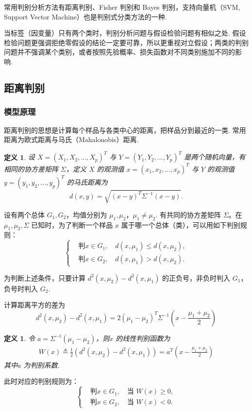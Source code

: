 \documentclass[12pt, a4paper, oneside]{ctexart}
\newtheorem{definition}[theorem]{定义}
\begin{document}
	常用判别分析方法有距离判别、Fisher 判别和 Bayes 判别，支持向量机（SVM, Support Vector Machine）也是判别式分类方法的一种.
	
	当标签（因变量）只有两个类时，判别分析问题与假设检验问题有相似之处. 假设检验问题更强调拒绝零假设的结论一定要可靠，所以更重视对立假设；两类的判别问题并不强调某个类别，或者按照先验概率、损失函数对不同类别施加不同的影响.
	
	\subsection{距离判别}
	\subsubsection{模型原理}
	距离判别的思想是计算每个样品与各类中心的距离，把样品分到最近的一类. 常用距离为欧式距离与马氏（Mahalonobis）距离.
	\begin{definition}
		设 $X = (X_1, X_2, \ldots, X_p)^T$ 与 $Y = (Y_1, Y_2, \ldots, Y_p)^T$ 是两个随机向量，有相同的协方差矩阵 $\Sigma$，定义 $X$ 的观测值 $x = (x_1, x_2, \ldots, x_p)^T$ 与 $Y$ 的观测值 $y = (y_1, y_2, \ldots, y_p)^T$ 的马氏距离为
		\begin{equation}
			d(x, y) = \sqrt{(x - y)^T \Sigma^{-1} (x - y)}. \label{Maha}
		\end{equation}
	\end{definition}
	
	设有两个总体 $G_1, G_2$，均值分别为 $\mu_1, \mu_2$，$\mu_1 \ne \mu_2$. 有共同的协方差矩阵 $\Sigma$。在 $\mu_1, \mu_2, \Sigma$ 已知时，为了判断一个样品 $x$ 属于哪一个总体（类），可以用如下判别规则：
	\[
	\left\{
	\begin{aligned}
		&\text{判} x \in G_1,\quad d(x, \mu_1) \leq d(x, \mu_2), \\
		&\text{判} x \in G_2,\quad d(x, \mu_1) > d(x, \mu_2).
	\end{aligned}
	\right.
	\]
	
	为判断上述条件，只要计算 $d^2(x, \mu_2) - d^2(x, \mu_1)$ 的正负号，非负时判入 $G_1$，负号时判入 $G_2$.
	
	计算距离平方的差为
	\begin{equation}
		d^2(x, \mu_2) - d^2(x, \mu_1) = 2(\mu_1 - \mu_2)^T \Sigma^{-1} \left(x - \frac{\mu_1 + \mu_2}{2}\right) \label{dsquareminus}
	\end{equation}

	\begin{definition}
		令 $a = \Sigma^{-1} (\mu_1 - \mu_2)$，则$x$ 的线性判别函数为
		\begin{align}
			W(x) \triangleq \frac{1}{2} \left(d^2(x, \mu_2) - d^2(x, \mu_1)\right)
			= a^T \left(x - \frac{\mu_1 + \mu_2}{2} \right)\label{LDF}
		\end{align}
		其中$a$ 为判别系数. 
		
	\end{definition}
	此时对应的判别规则为：
	\[
	\left\{
	\begin{aligned}
		&\text{判} x \in G_1,\quad \text{当 } W(x) \geq 0, \\
		&\text{判} x \in G_2,\quad \text{当 } W(x) < 0.
	\end{aligned}
	\right.
	\]
\end{document}
